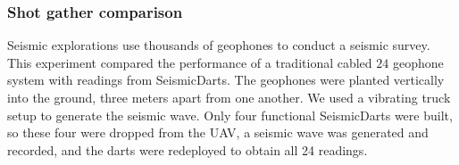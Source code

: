 


\subsubsection{Shot gather comparison} 
Seismic explorations use thousands of geophones to conduct a seismic survey. 
This experiment compared the performance of a traditional cabled $24$ geophone system with readings from SeismicDarts.
The geophones were planted vertically into the ground, three meters apart from one another.  
We used a vibrating truck setup to generate the seismic wave. 
Only four functional SeismicDarts were built, so these four were dropped from the UAV, a seismic wave was generated and recorded, and the darts were redeployed to obtain all 24 readings.

